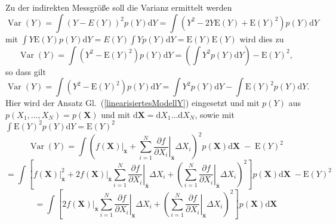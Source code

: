 Zu der indirekten Messgröße soll die Varianz ermittelt werden
\begin{equation}
\operatorname{Var}(Y) =
\int \left(Y - E(Y) \right)^2 p(Y) \mathrm{d}Y =
\int \left(Y^2 - 2 Y \mathrm{E}(Y) + \mathrm{E}(Y)^2\right)  p(Y) \mathrm{d}Y
\end{equation}
mit $\int Y \mathrm{E}(Y) p(Y) \mathrm{d}Y = E(Y) \int Y p(Y) \mathrm{d}Y =
\mathrm{E}(Y) \mathrm{E}(Y)$ wird dies zu
\begin{equation*}
\operatorname{Var}(Y)
= \int \left(Y^2 - \mathrm{E}(Y)^2\right)  p(Y) \mathrm{d}Y
= \left(\int Y^2 p(Y) \mathrm{d}Y \right) - \mathrm{E}(Y)^2,
\end{equation*}
so dass gilt
\begin{equation}
\operatorname{Var}(Y)
= \int \left(Y^2 - \mathrm{E}(Y)^2\right)  p(Y) \mathrm{d}Y
= \int Y^2 p(Y) \mathrm{d}Y - \int \mathrm{E}(Y)^2  p(Y) \mathrm{d}Y .
\end{equation}
Hier wird der Ansatz Gl.~(\ref{linearisiertesModellY}) eingesetzt und mit
$p(Y)$ aus $p(X_1,\dots,X_N) = p(\mathbf{X})$ und mit
$\mathrm{d} \mathbf{X} = \mathrm{d} X_1\dots \mathrm{d} X_N$,
sowie mit $\int \mathrm{E}(Y)^2  p(Y) \mathrm{d}Y = \mathrm{E}(Y)^2$
\begin{equation}
\operatorname{Var}(Y)
= \int \left( \left. f(\mathbf{X}) \right|_{\bar{\mathbf{x}}} +
\sum_{i=1}^N \left.
\frac{\partial f}{\partial X_i} \right|_{\bar{\mathbf{x}}} \Delta X_i
 \right)^2
p(\mathbf{X}) \mathrm{d} \mathbf{X}
 \; - \; \mathrm{E}(Y)^2
\end{equation}
\begin{equation*}
= \int \left[ \left. f(\mathbf{X}) \right|_{\bar{\mathbf{x}}}^2 +
2   \left. f(\mathbf{X}) \right|_{\bar{\mathbf{x}}}
\sum_{i=1}^N \left.
\frac{\partial f}{\partial X_i} \right|_{\bar{\mathbf{x}}} \Delta X_i
+ \left(
\sum_{i=1}^N \left.
\frac{\partial f}{\partial X_i} \right|_{\bar{\mathbf{x}}} \Delta X_i
 \right)^2 \right]  p(\mathbf{X}) \mathrm{d} \mathbf{X}
\; - \mathrm{E}(Y)^2
\end{equation*}
\begin{equation*}
= \int \left[
2   \left. f(\mathbf{X}) \right|_{\bar{\mathbf{x}}}
\sum_{i=1}^N \left.
\frac{\partial f}{\partial X_i} \right|_{\bar{\mathbf{x}}} \Delta X_i
+ \left(
\sum_{i=1}^N \left.
\frac{\partial f}{\partial X_i} \right|_{\bar{\mathbf{x}}} \Delta X_i
 \right)^2
\right]  p(\mathbf{X}) \mathrm{d} \mathbf{X}
\end{equation*}

